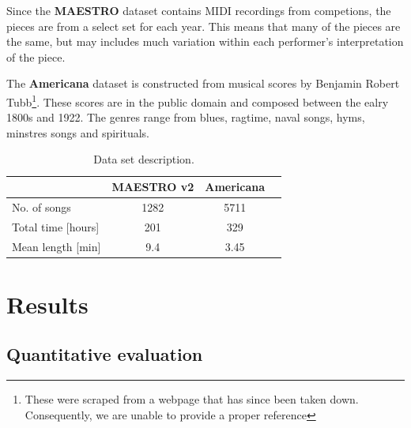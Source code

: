 \documentclass{IEEEtran}
\begin{document}
Since the \textbf{MAESTRO} dataset contains MIDI recordings from competions,
the pieces are from a select set for each year. This means that many of the
pieces are the same, but may includes much variation within each performer's
interpretation of the piece.

The \textbf{Americana} dataset is constructed from musical scores by Benjamin
Robert Tubb\footnote{These were scraped from a webpage that has since been
taken down. Consequently, we are unable to provide a proper reference}. These
scores are in the public domain and composed between the ealry 1800s and
1922. The genres range from blues, ragtime, naval songs, hyms, minstres songs
and spirituals.

\begin{table}
    \begin{center}
    \caption{
        Data set description.
        \label{tab:data}
    }
    \begin{tabular}{l c c c} \hline
            & MAESTRO v2 & Americana \\ \hline\hline
        No. of songs & 1282 & 5711 \\ \hline
        Total time [hours] & 201 & 329 \\ \hline
        Mean length [min] & 9.4 & 3.45 \\ \hline
    \end{tabular}
    \end{center}
\end{table}


\section{Results}

\subsection{Quantitative evaluation}
\end{document}
